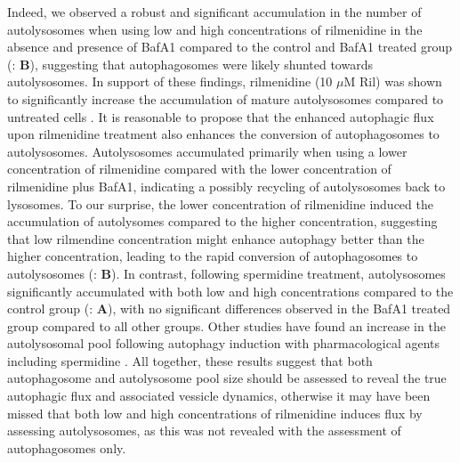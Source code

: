 {Indeed, we observed a robust and significant accumulation in the number of autolysosomes when using low and high concentrations of rilmenidine in the absence and presence of BafA1 compared to the control and BafA1 treated group (: \textbf{B}), suggesting that autophagosomes were likely shunted towards autolysosomes. In support of these findings,  rilmenidine (10 $\mu$M Ril) was shown to significantly increase the accumulation of mature autolysosomes compared to untreated cells \citep{Perera2018}. It is reasonable to propose that the enhanced autophagic flux upon rilmenidine treatment  also enhances the conversion of autophagosomes to autolysosomes. Autolysosomes accumulated primarily when using a lower concentration of rilmenidine compared with the lower concentration of rilmenidine plus BafA1, indicating a possibly recycling of autolysosomes back to lysosomes. To our surprise, the lower concentration of rilmenidine induced the accumulation of autolysomes compared to the higher concentration, suggesting that low rilmendine concentration might enhance autophagy better than the higher concentration, leading to the rapid conversion of autophagosomes to autolysosomes (: \textbf{B}). In contrast, following spermidine treatment, autolysosomes significantly accumulated with both low and high concentrations compared to the control group (: \textbf{A}), with no significant differences observed in the BafA1 treated group compared to all other groups. Other studies have found an increase in the autolysosomal pool following autophagy induction with pharmacological agents including spermidine \citep{DuToit2018a}. All together, these results suggest that both autophagosome and autolysosome pool size should be assessed to reveal the true autophagic flux and associated vessicle dynamics, otherwise it may have been missed that both low and high concentrations of rilmenidine induces flux by assessing autolysosomes, as this was not revealed with the assessment of autophagosomes only. 

}
